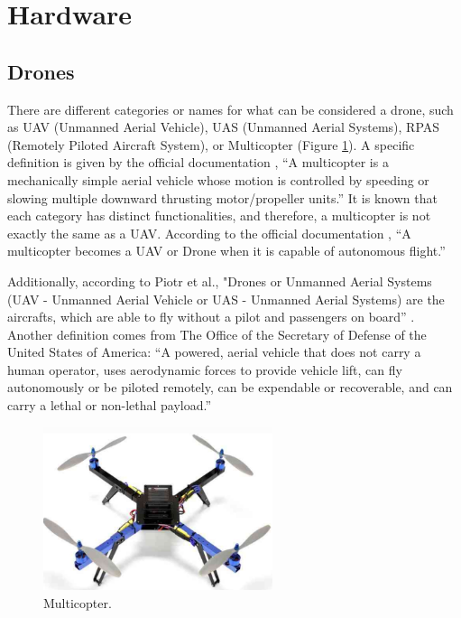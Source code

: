 \section{Hardware}

\subsection{Drones}

    There are different categories or names for what can be considered a drone, such as UAV (Unmanned Aerial Vehicle), UAS (Unmanned Aerial Systems), RPAS (Remotely Piloted Aircraft System), or Multicopter (Figure \ref{fig:multicopter}). A specific definition is given by the official documentation \cite{ardupilot}, “A multicopter is a mechanically simple aerial vehicle whose motion is controlled by speeding or slowing multiple downward thrusting motor/propeller units.” It is known that each category has distinct functionalities, and therefore, a multicopter is not exactly the same as a UAV. According to the official documentation \cite{ardupilot}, “A multicopter becomes a UAV or Drone when it is capable of autonomous flight.”

    Additionally, according to Piotr et al., "Drones or Unmanned Aerial Systems (UAV - Unmanned Aerial Vehicle or UAS - Unmanned Aerial Systems) are the aircrafts, which are able to fly without a pilot and passengers on board” \cite{piotr_drones}. Another definition comes from The Office of the Secretary of Defense of the United States of America: “A powered, aerial vehicle that does not carry a human operator, uses aerodynamic forces to provide vehicle lift, can fly autonomously or be piloted remotely, can be expendable or recoverable, and can carry a lethal or non-lethal payload.”

    \begin{figure}[h!]
        \centering
        \includegraphics[width=0.6\textwidth]{pictures/multicopter.png}
        \caption{Multicopter.}
        \label{fig:multicopter}
    \end{figure}

